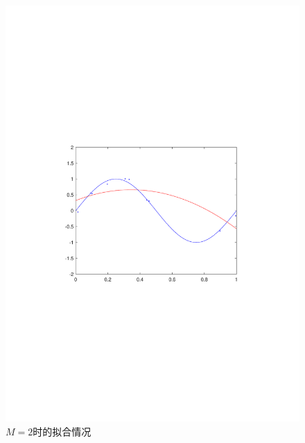 \documentclass{article}
\begin{document}
\begin{homeworkProblem}
\begin{figure}[htbp]
\begin{minipage}{0.49\linewidth}
			\includegraphics[width=0.9\linewidth]{images/title/M=2.pdf}
			\caption{$M=2$时的拟合情况}
			\label{M=2}%
		\end{minipage}


\end{figure}
\end{homeworkProblem}
\end{document}
